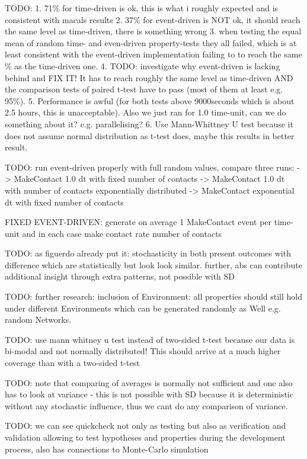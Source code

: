 TODO:
1. 71\% for time-driven is ok, this is what i roughly expected and is consistent with macals results
2. 37\% for event-driven is NOT ok, it should reach the same level as time-driven, there is something wrong
3. when testing the equal mean of random time- and even-driven property-tests they all failed, which is at least consistent with the event-driven implementation failing to to reach the same \% as the time-driven one.
4. TODO: investigate why event-driven is lacking behind and FIX IT! It has to reach roughly the same level as time-driven AND the comparison tests of paired t-test have to pass (most of them at least e.g. 95\%).
5. Performance is awful (for both tests above 9000seconds which is about 2.5 hours, this is unacceptable). Also we just ran for 1.0 time-unit, can we do something about it? e.g. parallelising?
6. Use Mann-Whittney U test because it does not assume normal distribution as t-test does, maybe this results in better result.

TODO: run event-driven properly with full random values, compare three runs:
-> MakeContact 1.0 dt with fixed number of contacts
-> MakeContact 1.0 dt with number of contacts exponentially distributed
-> MakeContact exponential dt with fixed number of contacts

FIXED EVENT-DRIVEN: generate on average 1 MakeContact event per time-unit and in each case make contact rate number of contacts

TODO: as figuerdo already put it: stochasticity in both  present outcomes with difference which are statistically but look look similar. further, abs can contribute additional insight through extra patterns, not possible with SD 

TODO: further research: inclusion of Environment: all  properties should still hold under different Environments which can be generated randomly as Well e.g. random Networks.

TODO: use mann whitney u test instead of two-sided t-test because our data is bi-modal and not normally distributed! This should arrive at a much higher coverage than with a two-sided t-test

TODO: note that comparing of averages is normally not sufficient and one also has to look at variance - this is not possible with SD because it is deterministic without any stochastic influence, thus we cant do any comparison of variance.

TODO: we can see quickcheck not only as testing but also as verification and validation allowing to test hypotheses and properties during the development process, also has connections to Monte-Carlo simulation

